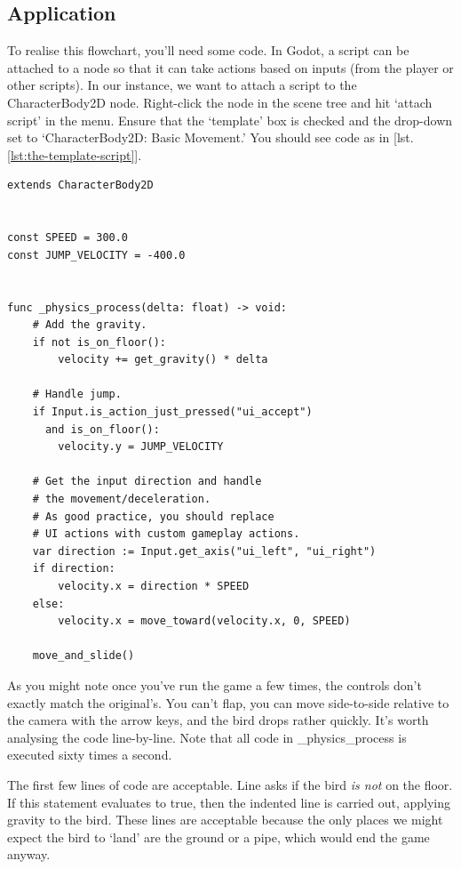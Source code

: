 \documentclass[14pt]{extarticle}
\newcommand{\prettyref}[2]{[{#1}.\ref{#2}]}
\newcommand{\encircle}[1]{\tikz[baseline=(char.base)]{\node[shape=circle,draw,inner sep=1pt] (char) {#1};}}
\begin{document}

\subsection*{Application}
To realise this flowchart, you'll need some code. In Godot, a script can be attached to a node so that it can take actions based on inputs (from the player or other scripts). In our instance, we want to attach a script to the CharacterBody2D node. Right-click the node in the scene tree and hit `attach script' in the menu. Ensure that the `template' box is checked and the drop-down set to `CharacterBody2D: Basic Movement.' You should see code as in \prettyref{lst}{lst:the-template-script}.

\begin{lstlisting}[language=gdscript, label={lst:the-template-script}, caption=The template script]
extends CharacterBody2D


const SPEED = 300.0
const JUMP_VELOCITY = -400.0


func _physics_process(delta: float) -> void:
	# Add the gravity.
	if not is_on_floor():
		velocity += get_gravity() * delta

	# Handle jump.
	if Input.is_action_just_pressed("ui_accept")
      and is_on_floor():
		velocity.y = JUMP_VELOCITY

	# Get the input direction and handle
	# the movement/deceleration.
	# As good practice, you should replace
	# UI actions with custom gameplay actions.
	var direction := Input.get_axis("ui_left", "ui_right")
	if direction:
		velocity.x = direction * SPEED
	else:
		velocity.x = move_toward(velocity.x, 0, SPEED)

	move_and_slide()
\end{lstlisting}

As you might note once you've run the game a few times, the controls don't exactly match the original's. You can't flap, you can move side-to-side relative to the camera with the arrow keys, and the bird drops rather quickly. It's worth analysing the code line-by-line. Note that all code in \_physics\_process is executed sixty times a second.

The first few lines of code are acceptable. Line \encircle{10} asks if the bird \emph{is not} on the floor. If this statement evaluates to true, then the indented line \encircle{11} is carried out, applying gravity to the bird. These lines are acceptable because the only places we might expect the bird to `land' are the ground or a pipe, which would end the game anyway.
\end{document}
